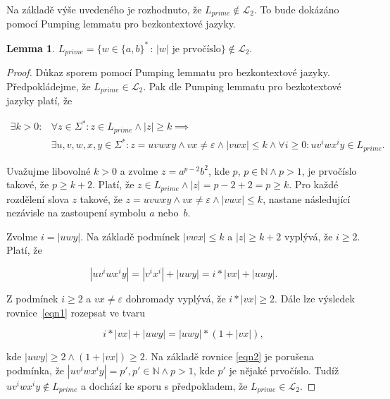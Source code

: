 \documentclass[a4paper, 12pt]{article}
\theoremstyle{definition}
\theoremstyle{definition}
\theoremstyle{definition}
\newtheorem{lemma}[theorem]{Lemma}
\theoremstyle{remark}
\begin{document}
Na základě výše uvedeného je rozhodnuto, že $L_{prime} \notin \mathcal{L}_2$. To bude dokázáno pomocí Pumping lemmatu pro bezkontextové jazyky.

\begin{lemma}
    $L_{prime} = \{w \in \{a, b\}^\ast \, : \, |w| \text{ je prvočíslo}\} \notin \mathcal{L}_2$.
\end{lemma}

\begin{proof}
    Důkaz sporem pomocí Pumping lemmatu pro bezkontextové jazyky. Předpokládejme, že $L_{prime} \in \mathcal{L}_2$. Pak dle Pumping lemmatu pro bezkotextové jazyky platí, že

    \begin{align*}
            \exists k > 0 : &\forall z \in \Sigma^\ast : z \in L_{prime} \wedge |z| \geq k \implies \\
            &\exists u, v, w, x, y \in \Sigma^\ast : z = uvwxy \wedge vx \neq \varepsilon \wedge |vwx| \leq k \wedge \forall i \geq 0: uv^iwx^iy \in L_{prime}.
    \end{align*}

    Uvažujme libovolné $k > 0$ a zvolme $z = a^{p-2}b^2$, kde $p$, $p \in \mathbb{N} \wedge p > 1$, je prvočíslo takové, že $p \geq k + 2$. Platí, že $z \in L_{prime} \wedge |z| = p - 2 + 2 = p \geq k$. Pro každé rozdělení slova $z$ takové, že $z = uvwxy \wedge vx \neq \varepsilon \wedge |vwx| \leq k$, nastane následující nezávisle na zastoupení symbolu $a$ nebo~$b$.
    
    Zvolme $i = |uwy|$. Na základě podmínek $|vwx| \leq k$ a $|z| \geq k + 2$ vyplývá, že $i \geq 2$. Platí, že

    \begin{equation}
    \label{eqn1}
    |uv^iwx^iy| = |v^ix^i| + |uwy| = i * |vx| + |uwy|.
    \end{equation}
    
    Z podmínek $i \geq 2$ a $vx \neq \varepsilon$ dohromady vyplývá, že $i * |vx| \geq 2$. Dále lze výsledek rovnice~\ref{eqn1} rozepsat ve tvaru

    \begin{equation}
    \label{eqn2}
    i * |vx| + |uwy| = |uwy| * (1 + |vx|),
    \end{equation}        

    \noindent
    kde $|uwy| \geq 2 \wedge (1 + |vx|) \geq 2$. Na základě rovnice \ref{eqn2} je porušena podmínka, že $|uv^iwx^iy| = p', p' \in \mathbb{N} \wedge p > 1$, kde $p'$ je nějaké prvočíslo. Tudíž $uv^iwx^iy \notin L_{prime}$ a dochází ke sporu s předpokladem, že $L_{prime} \in \mathcal{L}_2$.
\end{proof}
\end{document}
